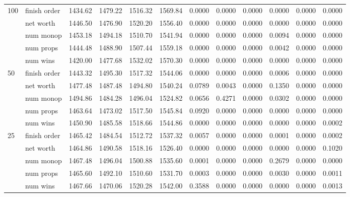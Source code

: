 \begin{landscape}
\begin{table}[ht]
\begin{tabularx}{\linewidth}{|p{1in}|p{1in}|r|r|r|r|r|r|r|r|r|r|}
      \multirow{5}{*}{100} & finish order & 1434.62 & 1479.22 & 1516.32 & 1569.84 & 0.0000 & 0.0000 & 0.0000 & 0.0000 & 0.0000 & 0.0000 \\
\cline{2-12}             & net worth & 1446.50 & 1476.90 & 1520.20 & 1556.40 & 0.0000 & 0.0000 & 0.0000 & 0.0000 & 0.0000 & 0.0000 \\
\cline{2-12}             & num monop & 1453.18 & 1494.18 & 1510.70 & 1541.94 & 0.0000 & 0.0000 & 0.0000 & 0.0094 & 0.0000 & 0.0000 \\
\cline{2-12}             & num props & 1444.48 & 1488.90 & 1507.44 & 1559.18 & 0.0000 & 0.0000 & 0.0000 & 0.0042 & 0.0000 & 0.0000 \\
\cline{2-12}             & num wins & 1420.00 & 1477.68 & 1532.02 & 1570.30 & 0.0000 & 0.0000 & 0.0000 & 0.0000 & 0.0000 & 0.0000 \\
      \cline{1-12}
      \multirow{5}{*}{50} & finish order & 1443.32 & 1495.30 & 1517.32 & 1544.06 & 0.0000 & 0.0000 & 0.0000 & 0.0006 & 0.0000 & 0.0000 \\
\cline{2-12}             & net worth & 1477.48 & 1487.48 & 1494.80 & 1540.24 & 0.0789 & 0.0043 & 0.0000 & 0.1350 & 0.0000 & 0.0000 \\
\cline{2-12}             & num monop & 1494.86 & 1484.28 & 1496.04 & 1524.82 & 0.0656 & 0.4271 & 0.0000 & 0.0302 & 0.0000 & 0.0000 \\
\cline{2-12}             & num props & 1463.64 & 1473.02 & 1517.50 & 1545.84 & 0.0920 & 0.0000 & 0.0000 & 0.0000 & 0.0000 & 0.0000 \\
\cline{2-12}             & num wins & 1450.90 & 1485.58 & 1518.66 & 1544.86 & 0.0000 & 0.0000 & 0.0000 & 0.0000 & 0.0000 & 0.0002 \\
      \cline{1-12}
      \multirow{5}{*}{25} & finish order & 1465.42 & 1484.54 & 1512.72 & 1537.32 & 0.0057 & 0.0000 & 0.0000 & 0.0001 & 0.0000 & 0.0002 \\
\cline{2-12}             & net worth & 1464.86 & 1490.58 & 1518.16 & 1526.40 & 0.0000 & 0.0000 & 0.0000 & 0.0000 & 0.0000 & 0.1020 \\
\cline{2-12}             & num monop & 1467.48 & 1496.04 & 1500.88 & 1535.60 & 0.0001 & 0.0000 & 0.0000 & 0.2679 & 0.0000 & 0.0000 \\
\cline{2-12}             & num props & 1465.60 & 1492.10 & 1510.60 & 1531.70 & 0.0003 & 0.0000 & 0.0000 & 0.0030 & 0.0000 & 0.0011 \\
\cline{2-12}             & num wins & 1467.66 & 1470.06 & 1520.28 & 1542.00 & 0.3588 & 0.0000 & 0.0000 & 0.0000 & 0.0000 & 0.0013 \\

\end{tabularx}
\end{table}
\end{landscape}
